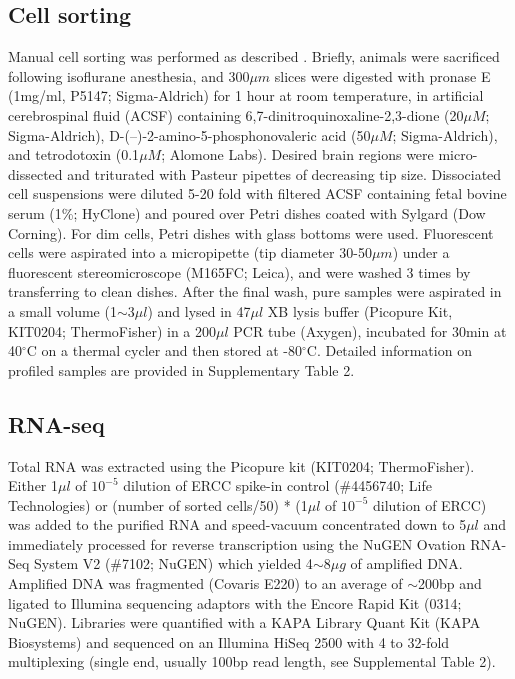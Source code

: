 \subsection{Cell sorting}
Manual cell sorting was performed as described \citep{Hempel_2007, Sugino_2014}. Briefly, animals were sacrificed following isoflurane anesthesia, and 300$\mu m$ slices were digested with pronase E (1mg/ml, P5147; Sigma-Aldrich) for 1 hour at room temperature, in artificial cerebrospinal fluid (ACSF) containing 6,7-dinitroquinoxaline-2,3-dione (20$\mu M$; Sigma-Aldrich), D-(–)-2-amino-5-phosphonovaleric acid (50$\mu M$; Sigma-Aldrich), and tetrodotoxin (0.1$\mu M$; Alomone Labs). Desired brain regions were micro-dissected and triturated with Pasteur pipettes of decreasing tip size. Dissociated cell suspensions were diluted 5-20 fold with filtered ACSF containing fetal bovine serum (1\%; HyClone) and poured over Petri dishes coated with Sylgard (Dow Corning). For dim cells, Petri dishes with glass bottoms were used. Fluorescent cells were aspirated into a micropipette (tip diameter 30-50$\mu m$) under a fluorescent stereomicroscope (M165FC; Leica), and were washed 3 times by transferring to clean dishes. After the final wash, pure samples were aspirated in a small volume (1$\sim$3$\mu l$) and lysed in 47$\mu l$ XB lysis buffer (Picopure Kit, KIT0204; ThermoFisher) in a 200$\mu l$ PCR tube (Axygen), incubated for 30min at 40$^{\circ}$C on a thermal cycler and then stored at -80$^{\circ}$C. Detailed information on profiled samples are provided in Supplementary Table 2.

\subsection{RNA-seq}
Total RNA was extracted using the Picopure kit (KIT0204; ThermoFisher). Either 1$\mu l$ of $10^{-5}$ dilution of ERCC spike-in control (\#4456740; Life Technologies) or (number of sorted cells/50) * (1$\mu l$ of $10^{-5}$ dilution of ERCC) was added to the purified RNA and speed-vacuum concentrated down to 5$\mu l$ and immediately processed for reverse transcription using the NuGEN Ovation RNA-Seq System V2 (\#7102; NuGEN) which yielded 4$\sim$8$\mu g$ of amplified DNA. Amplified DNA was fragmented (Covaris E220) to an average of $\sim$200bp and ligated to Illumina sequencing adaptors with the Encore Rapid Kit (0314; NuGEN). Libraries were quantified with a KAPA Library Quant Kit (KAPA Biosystems) and sequenced on an Illumina HiSeq 2500 with 4 to 32-fold multiplexing (single end, usually 100bp read length, see Supplemental Table 2).

